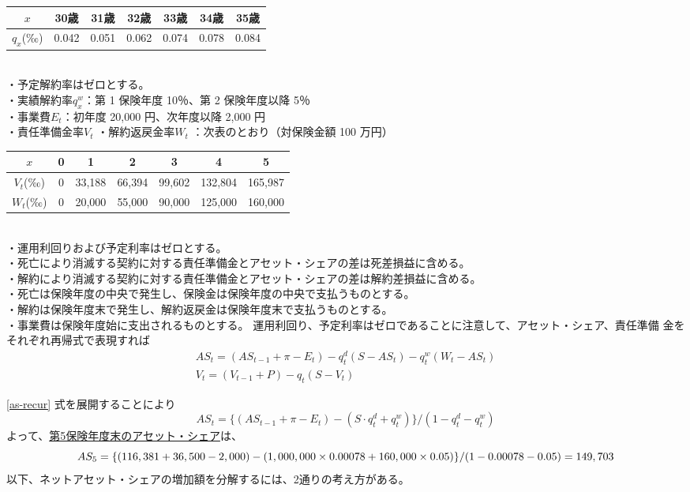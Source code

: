 \documentclass[report,gutter=10mm,fore-edge=10mm,uplatex,dvipdfmx]{jlreq}
\begin{document}
\begin{tabular}{|c|c|c|c|c|c|c|}
\hline
 $x$& 30歳& 31歳& 32歳& 33歳& 34歳& 35歳\\\hline
 $q_x$(‰)& 0.042& 0.051& 0.062& 0.074& 0.078& 0.084\\ \hline
\end{tabular}\\
・予定解約率はゼロとする。\\
・実績解約率$q_x^w$：第 1 保険年度 10％、第 2 保険年度以降 5％\\
・事業費$E_t$：初年度 20,000 円、次年度以降 2,000 円\\
・責任準備金率$V_t$ ・解約返戻金率$W_t$ ：次表のとおり（対保険金額 100 万円）

\begin{tabular}{|c|c|c|c|c|c|c|}
\hline
 $x$& 0& 1& 2& 3& 4& 5\\\hline
 $V_t$(‰)& 0& 33,188&66,394&99,602&132,804&165,987\\ \hline
 $W_t$(‰)& 0& 20,000&55,000&90,000&125,000&160,000\\ \hline
\end{tabular}\\
・運用利回りおよび予定利率はゼロとする。\\
・死亡により消滅する契約に対する責任準備金とアセット・シェアの差は死差損益に含める。\\
・解約により消滅する契約に対する責任準備金とアセット・シェアの差は解約差損益に含める。\\
・死亡は保険年度の中央で発生し、保険金は保険年度の中央で支払うものとする。\\
・解約は保険年度末で発生し、解約返戻金は保険年度末で支払うものとする。\\
・事業費は保険年度始に支出されるものとする。
\answer{}
運用利回り、予定利率はゼロであることに注意して、アセット・シェア、責任準備
金をそれぞれ再帰式で表現すれば
\begin{align}
 AS_t=(AS_{t-1}+\pi-E_t)-q^d_t(S-AS_t)-q^w_t(W_t-AS_t)\label{as-recur}\\
 V_t=(V_{t-1}+P) - q_t(S-V_t)\label{v-recur}
\end{align}

\eqref{as-recur} 式を展開することにより
$$
 AS_t=\{(AS_{t-1}+\pi-E_t)-(S\cdot q^d_t+q^w_t)\}/(1-q^d_t-q^w_t)
$$
よって、\underline{第5保険年度末のアセット・シェア}は、
$$
 AS_5=\{(116,381+36,500-2,000)-(1,000,000\times 0.00078+160,000\times 0.05)\}/(1-0.00078-0.05)\\
=149,703
$$
以下、ネットアセット・シェアの増加額を分解するには、2通りの考え方がある。
\end{document}
